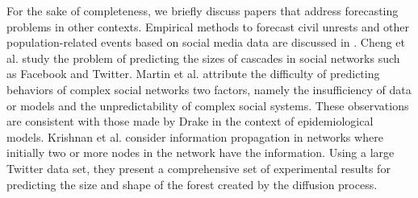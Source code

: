 \medskip
For the sake of completeness, we briefly discuss papers that 
address forecasting problems in other contexts.
Empirical methods to forecast civil unrests
and other population-related events based on social media data are discussed in 
\cite{Korkmaz_etal_2016,Muthaiah_etal_2016}.
Cheng et al. \cite{Cheng_etal_2014} study the problem
of predicting the sizes of cascades in social networks such as Facebook and Twitter.
Martin et al. \cite{Martin_etal_2016} attribute the difficulty 
of predicting behaviors of complex social networks two factors, namely
the insufficiency of data or models and the unpredictability of
complex social systems.
These observations are consistent with those made by 
Drake \cite{Drake-2005,Drake-2006} in the context of 
epidemiological models.
Krishnan et al. \cite{Krishnan_etal_2016} consider information
propagation in networks where initially two or more nodes in the
network  have the information.
Using a large Twitter data set, 
they present a comprehensive set of experimental results
for predicting the size and shape of the forest created
by the diffusion process.

